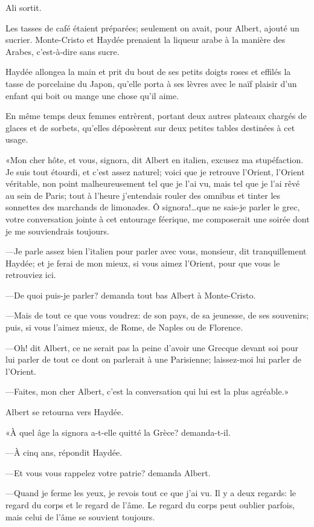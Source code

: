Ali sortit. 

Les tasses de café étaient préparées; seulement on avait, pour Albert, ajouté un sucrier. Monte-Cristo et Haydée prenaient la liqueur arabe à la manière des Arabes, c'est-à-dire sans sucre. 

Haydée allongea la main et prit du bout de ses petits doigts roses et effilés la tasse de porcelaine du Japon, qu'elle porta à ses lèvres avec le naïf plaisir d'un enfant qui boit ou mange une chose qu'il aime. 

En même temps deux femmes entrèrent, portant deux autres plateaux chargés de glaces et de sorbets, qu'elles déposèrent sur deux petites tables destinées à cet usage. 

«Mon cher hôte, et vous, signora, dit Albert en italien, excusez ma stupéfaction. Je suis tout étourdi, et c'est assez naturel; voici que je retrouve l'Orient, l'Orient véritable, non point malheureusement tel que je l'ai vu, mais tel que je l'ai rêvé au sein de Paris; tout à l'heure j'entendais rouler des omnibus et tinter les sonnettes des marchands de limonades. Ô signora!\dots que ne sais-je parler le grec, votre conversation jointe à cet entourage féerique, me composerait une soirée dont je me souviendrais toujours. 

—Je parle assez bien l'italien pour parler avec vous, monsieur, dit tranquillement Haydée; et je ferai de mon mieux, si vous aimez l'Orient, pour que vous le retrouviez ici. 

—De quoi puis-je parler? demanda tout bas Albert à Monte-Cristo. 

—Mais de tout ce que vous voudrez: de son pays, de sa jeunesse, de ses souvenirs; puis, si vous l'aimez mieux, de Rome, de Naples ou de Florence. 

—Oh! dit Albert, ce ne serait pas la peine d'avoir une Grecque devant soi pour lui parler de tout ce dont on parlerait à une Parisienne; laissez-moi lui parler de l'Orient. 

—Faites, mon cher Albert, c'est la conversation qui lui est la plus agréable.» 

Albert se retourna vers Haydée. 

«À quel âge la signora a-t-elle quitté la Grèce? demanda-t-il. 

—À cinq ans, répondit Haydée. 

—Et vous vous rappelez votre patrie? demanda Albert. 

—Quand je ferme les yeux, je revois tout ce que j'ai vu. Il y a deux regards: le regard du corps et le regard de l'âme. Le regard du corps peut oublier parfois, mais celui de l'âme se souvient toujours. 

